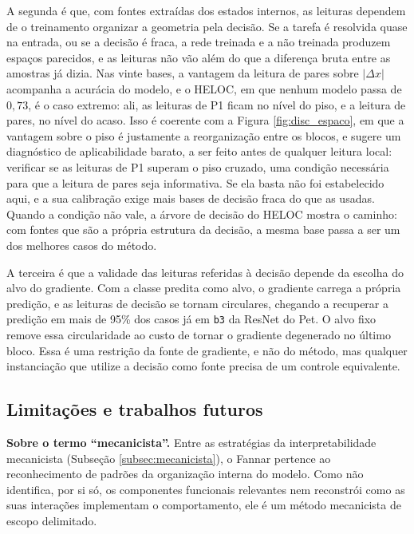 A segunda é que, com fontes extraídas dos estados internos, as leituras dependem de o treinamento organizar a geometria pela decisão. Se a tarefa é resolvida quase na entrada, ou se a decisão é fraca, a rede treinada e a não treinada produzem espaços parecidos, e as leituras não vão além do que a diferença bruta entre as amostras já dizia. Nas vinte bases, a vantagem da leitura de pares sobre $|\Delta x|$ acompanha a acurácia do modelo, e o HELOC, em que nenhum modelo passa de $0{,}73$, é o caso extremo: ali, as leituras de P1 ficam no nível do piso, e a leitura de pares, no nível do acaso. Isso é coerente com a Figura \ref{fig:disc_espaco}, em que a vantagem sobre o piso é justamente a reorganização entre os blocos, e sugere um diagnóstico de aplicabilidade barato, a ser feito antes de qualquer leitura local: verificar se as leituras de P1 superam o piso cruzado, uma condição necessária para que a leitura de pares seja informativa. Se ela basta não foi estabelecido aqui, e a sua calibração exige mais bases de decisão fraca do que as usadas. Quando a condição não vale, a árvore de decisão do HELOC mostra o caminho: com fontes que são a própria estrutura da decisão, a mesma base passa a ser um dos melhores casos do método.

A terceira é que a validade das leituras referidas à decisão depende da escolha do alvo do gradiente. Com a classe predita como alvo, o gradiente carrega a própria predição, e as leituras de decisão se tornam circulares, chegando a recuperar a predição em mais de 95\% dos casos já em \texttt{b3} da ResNet do Pet. O alvo fixo remove essa circularidade ao custo de tornar o gradiente degenerado no último bloco. Essa é uma restrição da fonte de gradiente, e não do método, mas qualquer instanciação que utilize a decisão como fonte precisa de um controle equivalente.

\subsection{Limitações e trabalhos futuros}\label{subsec:res_limitacoes}

\noindent\textbf{Sobre o termo ``mecanicista''.} Entre as estratégias da interpretabilidade mecanicista (Subseção \ref{subsec:mecanicista}), o Fannar pertence ao reconhecimento de padrões da organização interna do modelo. Como não identifica, por si só, os componentes funcionais relevantes nem reconstrói como as suas interações implementam o comportamento, ele é um método mecanicista de escopo delimitado.


